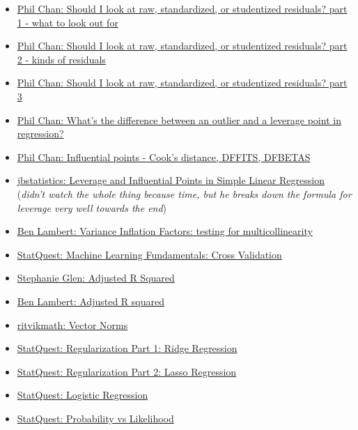 \documentclass[12pt, titlepage, french]{report}
\begin{document}
\begin{YTB_vids}
\begin{itemize}
	\item	\href{https://www.youtube.com/watch?v=UyAa5iwJ7m0&list=PLe0nS0mZ7vGGhYcDPNSVNu9gT3wGHbjhu&index=3}{Phil Chan: Should I look at raw, standardized, or studentized residuals? part 1 - what to look out for}
	\item	\href{https://www.youtube.com/watch?v=UyAa5iwJ7m0&list=PLe0nS0mZ7vGGhYcDPNSVNu9gT3wGHbjhu&index=4}{Phil Chan: Should I look at raw, standardized, or studentized residuals? part 2 - kinds of residuals}
	\item	\href{https://www.youtube.com/watch?v=mEdSj3wlN4Q}{Phil Chan: Should I look at raw, standardized, or studentized residuals? part 3}
	\item	\href{https://www.youtube.com/watch?v=s5X_Poq9dJA}{Phil Chan: What's the difference between an outlier and a leverage point in regression?}
	\item	\href{https://www.youtube.com/watch?v=31xA3hsxW6k}{Phil Chan: Influential points - Cook's distance, DFFITS, DFBETAS}
	\item	\href{https://www.youtube.com/watch?v=xc_X9GFVuVU&t=6m20s}{jbstatistics: Leverage and Influential Points in Simple Linear Regression} (\textit{didn't watch the whole thing because time, but he breaks down the formula for leverage very well towards the end})
	\item	\href{https://www.youtube.com/watch?v=0SBIXgPVex8}{Ben Lambert: Variance Inflation Factors: testing for multicollinearity}
	\item	\href{https://www.youtube.com/watch?v=fSytzGwwBVw}{StatQuest: Machine Learning Fundamentals: Cross Validation}
	\item	\href{https://www.youtube.com/watch?v=KjRrdb2x6dA}{Stephanie Glen: Adjusted R Squared}
	\item	\href{https://www.youtube.com/watch?v=8W2fGkU5LYU}{Ben Lambert: Adjusted R squared}
	\item	\href{https://www.youtube.com/watch?v=5fN2J8wYnfw}{ritvikmath: Vector Norms}
	\item	\href{https://www.youtube.com/watch?v=Q81RR3yKn30&list=PLblh5JKOoLUICTaGLRoHQDuF_7q2GfuJF}{StatQuest: Regularization Part 1: Ridge Regression}
	\item	\href{https://www.youtube.com/watch?v=NGf0voTMlcs&list=PLblh5JKOoLUICTaGLRoHQDuF_7q2GfuJF}{StatQuest: Regularization Part 2: Lasso Regression}
	\tcbline
	\item	\href{https://www.youtube.com/watch?v=yIYKR4sgzI8}{StatQuest: Logistic Regression}
	\item	\href{https://www.youtube.com/watch?v=pYxNSUDSFH4&feature=youtu.be}{StatQuest: Probability vs Likelihood}

\end{itemize}
\end{YTB_vids}
\end{document}
